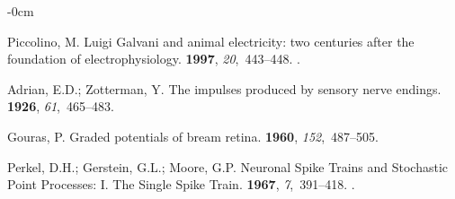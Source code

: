 \documentclass[brainsci, %
               review,submit,pdftex,moreauthors
               ]{Definitions/mdpi}
\begin{document}


\begin{adjustwidth}{-\extralength}{0cm}


%
% 
\begin{thebibliography}{999}

  Piccolino, M.
  \newblock Luigi {Galvani} and animal electricity: two centuries after the
    foundation of electrophysiology.
   {\bf 1997}, {\em 20},~443--448.
  .
  
  Adrian, E.D.; Zotterman, Y.
  \newblock The impulses produced by sensory nerve endings.
   {\bf 1926}, {\em 61},~465--483.
  
  Gouras, P.
  \newblock Graded potentials of bream retina.
   {\bf 1960}, {\em 152},~487--505.
  
  Perkel, D.H.; Gerstein, G.L.; Moore, G.P.
  \newblock Neuronal {Spike} {Trains} and {Stochastic} {Point} {Processes}: {I}.
    {The} {Single} {Spike} {Train}.
   {\bf 1967}, {\em 7},~391--418.
  .
  

\end{thebibliography}
\end{adjustwidth}
\end{document}
